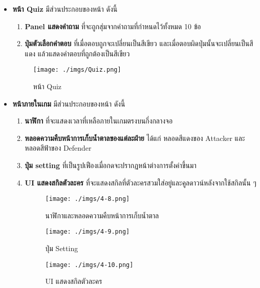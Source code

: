 \documentclass[12pt,oneside,openright,a4paper]{cpe-thai-project}
\begin{document}
\begin{enumerate}
\begin{itemize}
      \pagebreak

      \item \textbf{หน้า Quiz} มีส่วนประกอบของหน้า ดังนี้ 
      \begin{enumerate}
        \item \textbf{Panel แสดงคำถาม} ที่จะถูกสุ่มจากคำถามที่กำหนดไว้ทั้งหมด 10 ข้อ
        \item \textbf{ปุ่มตัวเลือกคำตอบ} ที่เมื่อตอบถูกจะเปลี่ยนเป็นสีเขียว และเมื่อตอบผิดปุ่มนั้นจะเปลี่ยนเป็นสีแดง 
        แล้วแสดงคำตอบที่ถูกต้องเป็นสีเขียว
      \end{enumerate}

      \begin{figure}[H]\centering
        \texttt{[image: ./imgs/Quiz.png]}
        \caption{หน้า Quiz}\label{fig:Quiz}
      \end{figure}

      \item \textbf{หน้าภายในเกม} มีส่วนประกอบของหน้า ดังนี้ 
      \begin{enumerate}
        \item \textbf{นาฬิกา} ที่จะแสดงเวลาที่เหลือภายในเกมตรงบนกึ่งกลางจอ
        \item \textbf{หลอดความคืบหน้าการเก็บน้ำตาลของแต่ละฝ่าย} ได้แก่ หลอดสีแดงของ Attacker และหลอดสีฟ้าของ Defender
        \item \textbf{ปุ่ม setting} ที่เป็นรูปเฟืองเมื่อกดจะปรากฏหน้าต่างการตั้งค่าขึ้นมา
        \item \textbf{UI แสดงสกิลตัวละคร} ที่จะแสดงสกิลที่ตัวละครสวมใส่อยู่และคูลดาวน์หลังจากใช้สกิลนั้น ๆ
        
        \begin{figure}[H]\centering
            \texttt{[image: ./imgs/4-8.png]}
            \caption{นาฬิกาและหลอดความคืบหน้าการเก็บน้ำตาล}\label{fig:4-8}
          \end{figure}
          \begin{figure}[H]\centering
            \begin{minipage}{.3\textwidth}
                \centering
                \texttt{[image: ./imgs/4-9.png]}
                \caption{ปุ่ม Setting}\label{fig:4-9}
            \end{minipage}
            \begin{minipage}{.3\textwidth}
                \centering
                \texttt{[image: ./imgs/4-10.png]}
                \caption{UI แสดงสกิลตัวละคร}\label{fig:4-10}
            \end{minipage}
          \end{figure}
      \end{enumerate} 


\end{itemize}
\end{enumerate}
\end{document}
